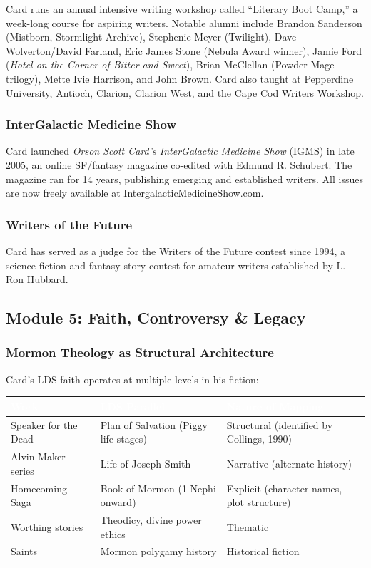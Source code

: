 \documentclass[11pt,letterpaper]{article}
\newcommand{\tableheader}[1]{\textbf{\sffamily\textcolor{white}{#1}}}
\begin{document}
Card runs an annual intensive writing workshop called ``Literary Boot Camp,'' a week-long course for aspiring writers. Notable alumni include Brandon Sanderson (Mistborn, Stormlight Archive), Stephenie Meyer (Twilight), Dave Wolverton/David Farland, Eric James Stone (Nebula Award winner), Jamie Ford (\textit{Hotel on the Corner of Bitter and Sweet}), Brian McClellan (Powder Mage trilogy), Mette Ivie Harrison, and John Brown. Card also taught at Pepperdine University, Antioch, Clarion, Clarion West, and the Cape Cod Writers Workshop.

\subsubsection{InterGalactic Medicine Show}

Card launched \textit{Orson Scott Card's InterGalactic Medicine Show} (IGMS) in late 2005, an online SF/fantasy magazine co-edited with Edmund R. Schubert. The magazine ran for 14 years, publishing emerging and established writers. All issues are now freely available at IntergalacticMedicineShow.com.

\subsubsection{Writers of the Future}

Card has served as a judge for the Writers of the Future contest since 1994, a science fiction and fantasy story contest for amateur writers established by L. Ron Hubbard.

\subsection{Module 5: Faith, Controversy \& Legacy}

\subsubsection{Mormon Theology as Structural Architecture}

Card's LDS faith operates at multiple levels in his fiction:

\begin{center}
\begin{tabularx}{\textwidth}{L{3cm}L{3.5cm}X}
\toprule
{}
\tableheader{Work} & \tableheader{LDS Parallel} & \tableheader{Nature of Mapping} \\
\midrule
Speaker for the Dead & Plan of Salvation (Piggy life stages) & Structural (identified by Collings, 1990) \\
Alvin Maker series & Life of Joseph Smith & Narrative (alternate history) \\
Homecoming Saga & Book of Mormon (1 Nephi onward) & Explicit (character names, plot structure) \\
Worthing stories & Theodicy, divine power ethics & Thematic \\
Saints & Mormon polygamy history & Historical fiction \\
\bottomrule
\end{tabularx}
\end{center}
\end{document}
